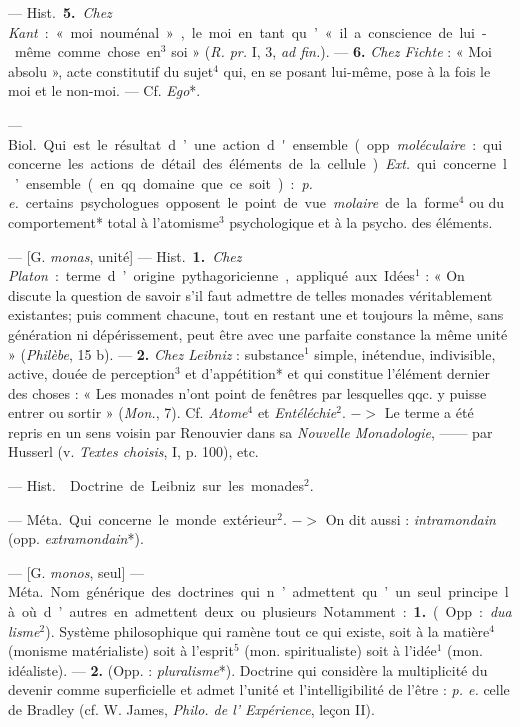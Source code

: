 \begin{itemize}[leftmargin=1cm, label=, itemsep=1pt]
— \si{Hist.} {\bf 5.} {\it Chez Kant} : « moi nouménal », le moi en tant
qu’ « il a conscience de lui-même comme chose en$^3$ soi » ({\it R. pr.} I,
3, {\it ad fin.}). —  {\bf 6.} {\it Chez Fichte} : « Moi absolu », acte
constitutif du sujet$^4$ qui, en se posant lui-même, pose à la fois le moi et
le non-moi. — Cf. {\it Ego}*.

 — \si{Biol.} Qui est le résultat d’une action d'ensemble (opp.
{\it moléculaire} : qui concerne les actions de détail des éléments de la
cellule). {\it Ext.} qui concerne l’ensemble (en qq. domaine que ce soit) :
{\it p. e.} certains psychologues opposent le point de vue {\it molaire} de
la forme$^4$ ou du comportement* total à l’atomisme$^3$ psychologique et à la
psycho. des éléments.

 — [G. {\it monas}, unité] — \si{Hist.} {\bf 1.} {\it Chez Platon} :
terme d’origine pythagoricienne, appliqué aux Idées$^1$ : « On discute la
question de savoir s’il faut admettre de telles monades véritablement
existantes; puis comment chacune, tout en restant une et toujours la même,
sans génération ni dépérissement, peut être avec une parfaite constance la
même unité » ({\it Philèbe}, 15 b). — {\bf 2.} {\it Chez Leibniz} :
substance$^1$ simple, inétendue, indivisible, active, douée de perception$^3$
et d’appétition* et qui constitue l'élément dernier des choses : « Les
monades n’ont point de fenêtres par lesquelles qqc. y puisse entrer ou
sortir » ({\it Mon.}, 7). Cf. {\it Atome}$^4$ et {\it Entéléchie}$^2$. $->$
Le terme a été repris en un sens voisin par Renouvier dans sa {\it Nouvelle
Monadologie}, —— par Husserl (v. {\it Textes choisis}, I, p. 100), etc.

 — \si{Hist.}  Doctrine de Leibniz sur les
monades$^2$.

 — \si{Méta.} Qui concerne le monde extérieur$^2$. $->$ On dit
aussi : {\it intramondain} (opp. {\it extramondain}*).

 — [G. {\it monos}, seul] —  \si{Méta.} Nom générique des
doctrines qui n’admettent qu’un seul principe là où d’autres en admettent
deux ou plusieurs. Notamment : {\bf 1.} (Opp. : {\it dualisme}$^2$).
Système philosophique qui ramène tout ce qui existe, soit à la matière$^4$
(monisme matérialiste) soit à l’esprit$^5$ (mon. spiritualiste) soit à
l’idée$^1$ (mon. idéaliste). — {\bf 2.} (Opp. : {\it pluralisme}*). Doctrine
qui considère la multiplicité du devenir comme superficielle et admet l'unité
et l’intelligibilité de l’être : {\it p. e.} celle de Bradley (cf. W. James,
{\it Philo. de l’ Expérience}, leçon II).


\end{itemize}

